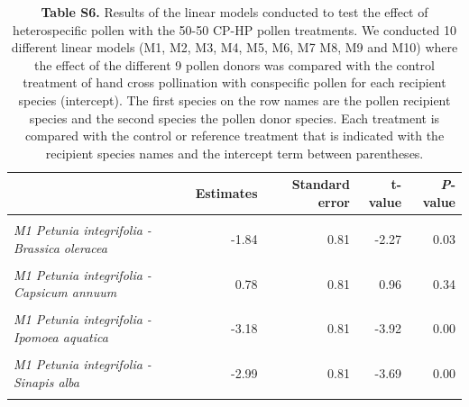 \documentclass[12pt,]{article}
\begin{document}
\begin{longtable}[t]{>{}lrrrr}
\caption{\label{tab:unnamed-chunk-6}\textbf{Table S6.} Results of the linear models conducted to test the effect of heterospecific pollen with the 50-50 CP-HP pollen treatments. We conducted 10 different linear models (M1, M2, M3, M4, M5, M6, M7 M8, M9 and M10) where the effect of the different 9 pollen donors was compared with the control treatment of hand cross pollination with conspecific pollen for each recipient species (intercept). The first species on the row names are the pollen recipient species and the second species the pollen donor species. Each treatment is compared with the control or reference treatment that is indicated with the recipient species names and the intercept term between parentheses.}\\
\toprule
\textbf{ } & \textbf{Estimates} & \textbf{Standard error} & \textbf{t-value} & \textbf{{\textit{P}}-value}\\
\midrule
\em{\cellcolor{gray!6}{M1 Petunia integrifolia - (Intercept)}} & \cellcolor{gray!6}{4.63} & \cellcolor{gray!6}{0.49} & \cellcolor{gray!6}{9.36} & \cellcolor{gray!6}{0.00}\\
\addlinespace
\em{M1 Petunia integrifolia - Brassica oleracea} & -1.84 & 0.81 & -2.27 & 0.03\\
\addlinespace
\em{\cellcolor{gray!6}{M1 Petunia integrifolia - Brassica rapa}} & \cellcolor{gray!6}{-0.97} & \cellcolor{gray!6}{0.81} & \cellcolor{gray!6}{-1.19} & \cellcolor{gray!6}{0.24}\\
\addlinespace
\em{M1 Petunia integrifolia - Capsicum annuum} & 0.78 & 0.81 & 0.96 & 0.34\\
\addlinespace
\em{\cellcolor{gray!6}{M1 Petunia integrifolia - Eruca vesicaria}} & \cellcolor{gray!6}{-0.91} & \cellcolor{gray!6}{0.81} & \cellcolor{gray!6}{-1.12} & \cellcolor{gray!6}{0.26}\\
\addlinespace
\em{M1 Petunia integrifolia - Ipomoea aquatica} & -3.18 & 0.81 & -3.92 & 0.00\\
\addlinespace
\em{\cellcolor{gray!6}{M1 Petunia integrifolia - Ipomoea purpurea}} & \cellcolor{gray!6}{-4.21} & \cellcolor{gray!6}{0.81} & \cellcolor{gray!6}{-5.19} & \cellcolor{gray!6}{0.00}\\
\addlinespace
\em{M1 Petunia integrifolia - Sinapis alba} & -2.99 & 0.81 & -3.69 & 0.00\\
\addlinespace
\em{\cellcolor{gray!6}{M1 Petunia integrifolia - Solanum lycopersicum}} & \cellcolor{gray!6}{-2.40} & \cellcolor{gray!6}{0.81} & \cellcolor{gray!6}{-2.96} & \cellcolor{gray!6}{0.00}\\

\end{longtable}
\end{document}
